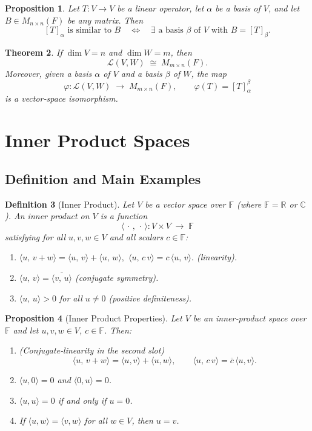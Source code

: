 \documentclass[12pt]{article}
\theoremstyle{break}             %
\newtheorem{thm}{Theorem}          %
\newtheorem{prop}[thm]{Proposition}%
\newtheorem{defn}[thm]{Definition}
\begin{document}
\begin{prop}
Let $T:V\to V$ be a linear operator, let $\alpha$ be a basis of $V$, and let $B\in M_{n\times n}(F)$ be any matrix.  Then
\[
[T]_\alpha \text{ is similar to } B
\quad\Longleftrightarrow\quad
\exists \text{ a basis }\beta\text{ of }V\text{ with }B = [T]_\beta.
\]
\end{prop}

\begin{thm}
If $\dim V = n$ and $\dim W = m$, then
\[
\mathcal{L}(V,W)\;\cong\;M_{m\times n}(F).
\]
Moreover, given a basis $\alpha$ of $V$ and a basis $\beta$ of $W$, the map
\[
\varphi:\mathcal{L}(V,W)\;\longrightarrow\;M_{m\times n}(F),
\qquad
\varphi(T) = [T]_\alpha^\beta
\]
is a vector‐space isomorphism.
\end{thm}

\section{Inner Product Spaces}

\subsection{Definition and Main Examples}

\begin{defn}[Inner Product]
Let \(V\) be a vector space over \(\mathbb{F}\) (where \(\mathbb{F}=\mathbb{R}\) or \(\mathbb{C}\)).  An \emph{inner product} on \(V\) is a function
\[
\langle\,\cdot\,,\,\cdot\,\rangle \colon V\times V \;\longrightarrow\; \mathbb{F}
\]
satisfying for all \(u,v,w\in V\) and all scalars \(c\in\mathbb{F}\):
\begin{enumerate}
  \item \(\displaystyle \langle u,\,v+w\rangle = \langle u,\,v\rangle + \langle u,\,w\rangle,\)
    \quad\(\langle u,\,c\,v\rangle = c\,\langle u,\,v\rangle.\)
    \quad(\emph{linearity}).
  \item \(\displaystyle \langle u,\,v\rangle = \overline{\langle v,\,u\rangle}\)
    \quad(\emph{conjugate symmetry}).
  \item \(\displaystyle \langle u,\,u\rangle > 0\) for all \(u\neq 0\)
    \quad(\emph{positive definiteness}).
\end{enumerate}
\end{defn}

\begin{prop}[Inner Product Properties]
Let $V$ be an inner‐product space over $\mathbb F$ and let $u,v,w\in V$, $c\in\mathbb F$.  Then:
\begin{enumerate}
\item \emph{(Conjugate‐linearity in the second slot)}  
\[
\langle u,\,v+w\rangle = \langle u,v\rangle + \langle u,w\rangle,
\qquad
\langle u,\,c\,v\rangle = \overline{c}\,\langle u,v\rangle.
\]
\item $\langle u,0\rangle = 0$ and $\langle 0,u\rangle = 0$.
\item $\langle u,u\rangle = 0$ if and only if $u=0$.
\item If $\langle u,w\rangle = \langle v,w\rangle$ for all $w\in V$, then $u=v$.
\end{enumerate}
\end{prop}
\end{document}
